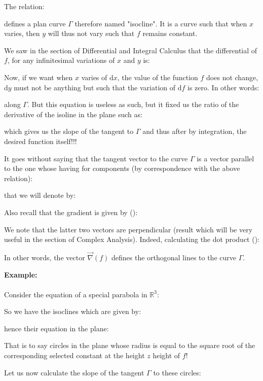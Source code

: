 {	The relation:
	
	defines a plan curve $\Gamma$ therefore named "isocline". It is a curve such that when $x$ varies, then $y$ will thus not vary such that $f$ remains constant.
	
	We saw in the section of Differential and Integral Calculus that the differential of $f$, for any infinitesimal variations of $x$ and $y$ is:
	
	Now, if we want when $x$ varies of $\mathrm{d}x$, the value of the function $f$ does not change, $\mathrm{d}y$ must not be anything but such that the variation of $\mathrm{d}f$ is zero. In other words:
	
	along $\Gamma$. But this equation is useless as such, but it fixed us the ratio of the derivative of the isoline in the plane such as:
	
	which gives us the slope of the tangent to $\Gamma$ and thus after by integration, the desired function itself!!!
	
	It goes without saying that the tangent vector to the curve $\Gamma$ is a vector parallel to the one whose having for components (by correspondence with the above relation):
	
	that we will denote by:
	
	Also recall that the gradient is given by ():
	
	We note that the latter two vectors are perpendicular (result which will be very useful in the section of Complex Analysis). Indeed, calculating the dot product ():
	
	In other words, the vector $\vec{\nabla}(f)$ defines the orthogonal lines to the curve $\Gamma$.
	\begin{tcolorbox}[colframe=black,colback=white,sharp corners]
	\textbf{{\Large {}}Example:}\\\\
	Consider the equation of a special parabola in $\mathbb{R}^3$:
	
	So we have the isoclines which are given by:
	
	hence their equation in the plane:
	
	That is to say circles in the plane whose radius is equal to the square root of the corresponding selected constant at the height $z$ height of $f$!
	
	Let us now calculate the slope of the tangent $\Gamma$ to these circles:
	

\end{tcolorbox}}
